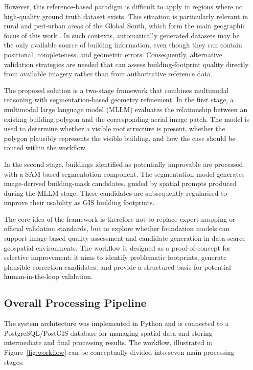 However, this reference-based paradigm is difficult to apply in regions where no high-quality ground truth dataset exists. This situation is particularly relevant in rural and peri-urban areas of the Global South, which form the main geographic focus of this work \citep{herfort2023spatio}. In such contexts, automatically generated datasets may be the only available source of building information, even though they can contain positional, completeness, and geometric errors. Consequently, alternative validation strategies are needed that can assess building-footprint quality directly from available imagery rather than from authoritative reference data.

The proposed solution is a two-stage framework that combines multimodal reasoning with segmentation-based geometry refinement. In the first stage, a multimodal large language model (MLLM) evaluates the relationship between an existing building polygon and the corresponding aerial image patch. The model is used to determine whether a visible roof structure is present, whether the polygon plausibly represents the visible building, and how the case should be routed within the workflow.

In the second stage, buildings identified as potentially improvable are processed with a SAM-based segmentation component. The segmentation model generates image-derived building-mask candidates, guided by spatial prompts produced during the MLLM stage. These candidates are subsequently regularised to improve their usability as GIS building footprints.

The core idea of the framework is therefore not to replace expert mapping or official validation standards, but to explore whether foundation models can support image-based quality assessment and candidate generation in data-scarce geospatial environments. The workflow is designed as a proof-of-concept for selective improvement: it aims to identify problematic footprints, generate plausible correction candidates, and provide a structured basis for potential human-in-the-loop validation.

\subsection{Overall Processing Pipeline}

The system architecture was implemented in Python and is connected to a PostgreSQL/PostGIS database for managing spatial data and storing intermediate and final processing results. The workflow, illustrated in Figure~\ref{fig:workflow} can be conceptually divided into seven main processing stages:

